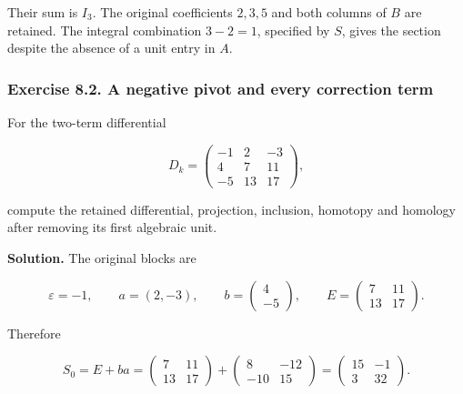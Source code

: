 Their sum is \(I_3\). The original coefficients \(2,3,5\) and both columns of \(B\) are retained. The integral combination \(3-2=1\), specified by \(S\), gives the section despite the absence of a unit entry in \(A\).

\subsubsection{Exercise 8.2. A negative pivot and every correction term}
\label{courseIII:integral-handle-chains-and-signed-incidences:exercise-8.2}

\label{courseIII:handle-chains:8.2}

For the two-term differential

\begin{equation}
D_k=\begin{pmatrix}-1&2&-3\\4&7&11\\-5&13&17\end{pmatrix},
 \label{courseIII:integral-handle-chains-and-signed-incidences:eq:8.5}
\end{equation}

compute the retained differential, projection, inclusion, homotopy and homology after removing its first algebraic unit.

\textbf{Solution.} The original blocks are

\begin{equation}
\varepsilon=-1,\qquad a=(2,-3),\qquad
 b=\begin{pmatrix}4\\-5\end{pmatrix},\qquad
 E=\begin{pmatrix}7&11\\13&17\end{pmatrix}.
 \label{courseIII:integral-handle-chains-and-signed-incidences:eq:8.6}
\end{equation}

Therefore

\begin{equation}
S_0=E+ba
 =\begin{pmatrix}7&11\\13&17\end{pmatrix}
 +\begin{pmatrix}8&-12\\-10&15\end{pmatrix}
 =\begin{pmatrix}15&-1\\3&32\end{pmatrix}.
 \label{courseIII:integral-handle-chains-and-signed-incidences:eq:8.7}
\end{equation}

